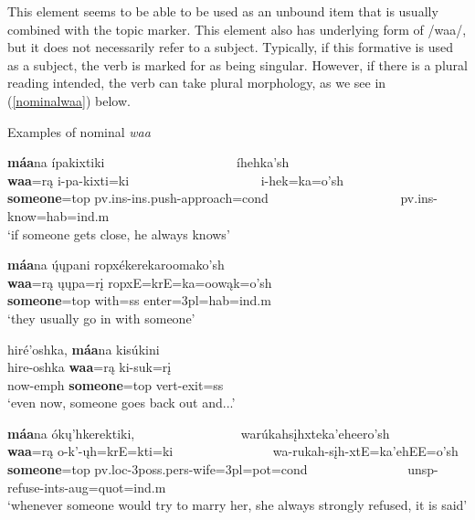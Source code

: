 This element seems to be able to be used as an unbound item that is usually combined with the topic marker. This element also has underlying form of /waa/, but it does not necessarily refer to a subject. Typically, if this formative is used as a subject, the verb is marked for as being singular. However, if there is a plural reading intended, the verb can take plural morphology, as we see in (\ref{nominalwaa}) below.



\begin{exe}

\item\label{nominalwaa} Examples of nominal \textit{waa}

	\begin{xlist}
	
	\item \glll \textbf{máa}na ípakixtiki ~ ~ ~ ~ ~ ~ ~ ~ ~ ~ ~ ~  íhehka'sh\\
	\textbf{waa}=rą i-pa-kixti=ki ~ ~ ~ ~ ~ ~ ~ ~ ~ ~ ~ ~  i-hek=ka=o'sh\\
	\textbf{\textnormal{someone}}=top pv.ins-ins.push-\textnormal{approach}=cond ~ ~ ~ ~ ~ ~ ~ ~ ~ ~ ~ ~ pv.ins-\textnormal{know}=hab=ind.m\\
	\glt `if someone gets close, he always knows' \citep[155]{hollow1973b}
	
	\item \glll \textbf{máa}na ų́ųpani ropxékerekaroomako'sh\\
	\textbf{waa}=rą ųųpa=rį ropxE=krE=ka=oowąk=o'sh\\
	\textbf{\textnormal{someone}}=top \textnormal{with}=ss \textnormal{enter}=3pl=hab=ind.m\\
	\glt `they usually go in with someone' \citep[171]{hollow1973b}
	
	\item \glll hiré'oshka, \textbf{máa}na kisúkini\\
	hire-oshka \textbf{waa}=rą ki-suk=rį\\
	\textnormal{now}-emph \textbf{\textnormal{someone}}=top vert-\textnormal{exit}=ss\\
	\glt `even now, someone goes back out and...' \citep[207]{hollow1973b}
	
	\item\label{nominalwaaD} \glll \textbf{máa}na ókų'hkerektiki,~ ~ ~ ~ ~ ~ ~ ~ ~ ~  warúkahsįhxteka'eheero'sh\\
	\textbf{waa}=rą o-k'-ųh=krE=kti=ki ~ ~ ~ ~ ~ ~ ~ ~ ~ wa-rukah-sįh-xtE=ka'ehEE=o'sh\\
	\textbf{\textnormal{someone}}=top pv.loc-3poss.pers-\textnormal{wife}=3pl=pot=cond ~ ~ ~ ~ ~ ~ ~ ~ ~ unsp-\textnormal{refuse}-ints-aug=quot=ind.m\\
	\glt `whenever someone would try to marry her, she always strongly refused, it is said' \citep[101]{hollow1973a} 
	

\end{xlist}
\end{exe}

